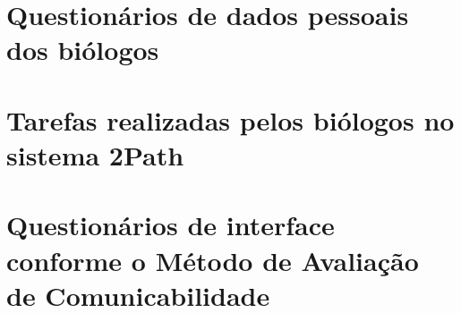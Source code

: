 \appendix

\chapter{Questionários de dados pessoais dos biólogos}\label{questionario_dados_pessoais}



\chapter{Tarefas realizadas pelos biólogos no sistema 2Path}\label{tarefas}



\chapter{Questionários de interface conforme o Método de Avaliação de Comunicabilidade}\label{questionario_interface}


